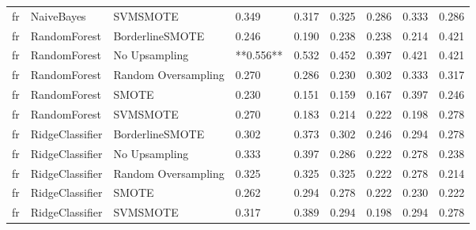 \begin{tabular}{lllllllll}
      fr &                   NaiveBayes &            SVMSMOTE &     0.349 &                     0.317 &                 0.325 &                  0.286 &                                   0.333 &     0.286 \\
      fr &                 RandomForest &     BorderlineSMOTE &     0.246 &                     0.190 &                 0.238 &                  0.238 &                                   0.214 &     0.421 \\
      fr &                 RandomForest &       No Upsampling & **0.556** &                     0.532 &                 0.452 &                  0.397 &                                   0.421 &     0.421 \\
      fr &                 RandomForest & Random Oversampling &     0.270 &                     0.286 &                 0.230 &                  0.302 &                                   0.333 &     0.317 \\
      fr &                 RandomForest &               SMOTE &     0.230 &                     0.151 &                 0.159 &                  0.167 &                                   0.397 &     0.246 \\
      fr &                 RandomForest &            SVMSMOTE &     0.270 &                     0.183 &                 0.214 &                  0.222 &                                   0.198 &     0.278 \\
      fr &              RidgeClassifier &     BorderlineSMOTE &     0.302 &                     0.373 &                 0.302 &                  0.246 &                                   0.294 &     0.278 \\
      fr &              RidgeClassifier &       No Upsampling &     0.333 &                     0.397 &                 0.286 &                  0.222 &                                   0.278 &     0.238 \\
      fr &              RidgeClassifier & Random Oversampling &     0.325 &                     0.325 &                 0.325 &                  0.222 &                                   0.278 &     0.214 \\
      fr &              RidgeClassifier &               SMOTE &     0.262 &                     0.294 &                 0.278 &                  0.222 &                                   0.230 &     0.222 \\
      fr &              RidgeClassifier &            SVMSMOTE &     0.317 &                     0.389 &                 0.294 &                  0.198 &                                   0.294 &     0.278 \\

\end{tabular}
